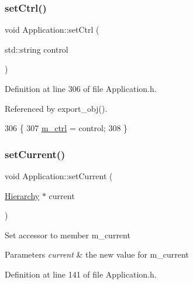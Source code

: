 \mbox{\label{classApplication_a451a04a80f59a76fb13b6fae6c07439a}} 
\subsubsection{\texorpdfstring{set\+Ctrl()}{setCtrl()}}
{\footnotesize\ttfamily void Application\+::set\+Ctrl (\begin{DoxyParamCaption}\item[{std\+::string}]{control }\end{DoxyParamCaption})\hspace{0.3cm}{\ttfamily [inline]}}



Definition at line 306 of file Application.\+h.



Referenced by export\+\_\+obj().


\begin{DoxyCode}
306                                    \{
307     \hyperlink{classApplication_aa371ed989ed34038df400c4d1b41b37f}{m\_ctrl} = control;
308   \}
\end{DoxyCode}
\mbox{\label{classApplication_a0f0a9e376d9f1716e01e86c94ae3499f}} 
\subsubsection{\texorpdfstring{set\+Current()}{setCurrent()}}
{\footnotesize\ttfamily void Application\+::set\+Current (\begin{DoxyParamCaption}\item[{\hyperlink{classHierarchy}{Hierarchy} $\ast$}]{current }\end{DoxyParamCaption})\hspace{0.3cm}{\ttfamily [inline]}}

Set accessor to member m\+\_\+current 
\begin{DoxyParams}{Parameters}
{\em current} & the new value for m\+\_\+current \\
\hline
\end{DoxyParams}


Definition at line 141 of file Application.\+h.



